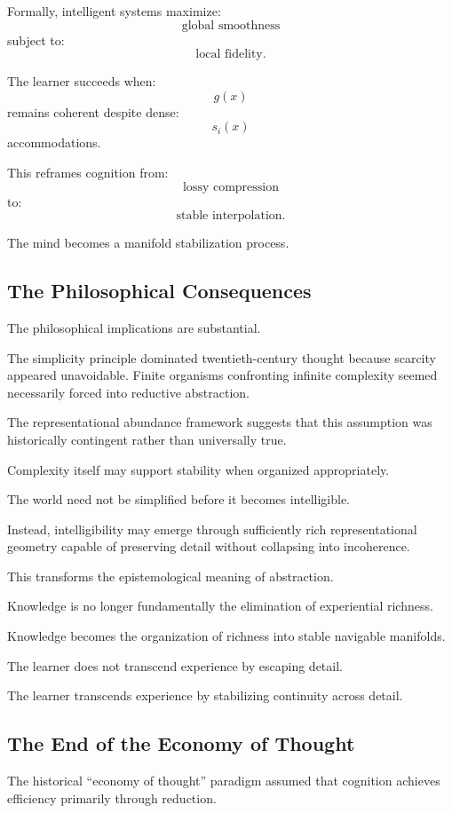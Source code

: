 \documentclass[12pt,a4paper]{article}
\begin{document}
Formally, intelligent systems maximize:
\[
\text{global smoothness}
\]
subject to:
\[
\text{local fidelity}.
\]

The learner succeeds when:
\[
g(x)
\]
remains coherent despite dense:
\[
s_i(x)
\]
accommodations.

This reframes cognition from:
\[
\text{lossy compression}
\]
to:
\[
\text{stable interpolation}.
\]

The mind becomes a manifold stabilization process.

\subsection{The Philosophical Consequences}

The philosophical implications are substantial.

The simplicity principle dominated twentieth-century thought because scarcity appeared unavoidable. Finite organisms confronting infinite complexity seemed necessarily forced into reductive abstraction.

The representational abundance framework suggests that this assumption was historically contingent rather than universally true.

Complexity itself may support stability when organized appropriately.

The world need not be simplified before it becomes intelligible.

Instead, intelligibility may emerge through sufficiently rich representational geometry capable of preserving detail without collapsing into incoherence.

This transforms the epistemological meaning of abstraction.

Knowledge is no longer fundamentally the elimination of experiential richness.

Knowledge becomes the organization of richness into stable navigable manifolds.

The learner does not transcend experience by escaping detail.

The learner transcends experience by stabilizing continuity across detail.

\subsection{The End of the Economy of Thought}

The historical ``economy of thought'' paradigm assumed that cognition achieves efficiency primarily through reduction.
\end{document}
